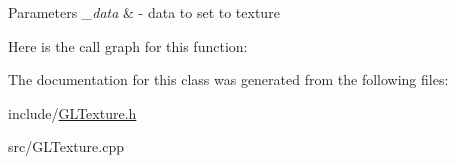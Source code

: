 \begin{DoxyParams}{Parameters}
{\em \-\_\-data} & -\/ data to set to texture \\
\hline
\end{DoxyParams}


Here is the call graph for this function\-:




The documentation for this class was generated from the following files\-:\begin{DoxyCompactItemize}
\item 
include/\hyperlink{_g_l_texture_8h}{G\-L\-Texture.\-h}\item 
src/G\-L\-Texture.\-cpp\end{DoxyCompactItemize}
